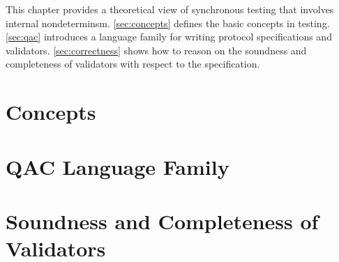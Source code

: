 This chapter provides a theoretical view of synchronous testing that involves
internal nondeterminsm.  \autoref{sec:concepts} defines the basic concepts in
testing.  \autoref{sec:qac} introduces a language family for writing protocol
specifications and validators.  \autoref{sec:correctness} shows how to reason on
the soundness and completeness of validators with respect to the specification.

\section{Concepts}
\label{sec:concepts}


\section{QAC Language Family}
\label{sec:qac}


\section{Soundness and Completeness of Validators}
\label{sec:correctness}

